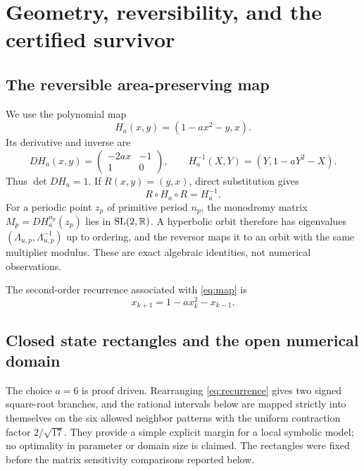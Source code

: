 \section{Geometry, reversibility, and the certified survivor}
\label{sec:geometry}

\subsection{The reversible area-preserving map}

We use the polynomial map
\begin{equation}
 H_a(x,y)=(1-a x^2-y,x).
 \label{eq:map}
\end{equation}
Its derivative and inverse are
\begin{equation}
 DH_a(x,y)=
 \begin{pmatrix}-2ax&-1\\1&0\end{pmatrix},
 \qquad
 H_a^{-1}(X,Y)=(Y,1-aY^2-X).
 \label{eq:derivative-inverse}
\end{equation}
Thus $\det DH_a=1$.  If $R(x,y)=(y,x)$, direct substitution gives
\begin{equation}
 R\circ H_a\circ R=H_a^{-1}.
 \label{eq:reversor}
\end{equation}
For a periodic point $z_p$ of primitive period $n_p$, the monodromy matrix
$M_p=DH_a^{n_p}(z_p)$ lies in $\mathrm{SL}(2,\mathbb{R})$.  A hyperbolic orbit
therefore has eigenvalues $(\Lambda_{u,p},\Lambda_{u,p}^{-1})$ up to ordering,
and the reversor maps it to an orbit with the same multiplier modulus.  These
are exact algebraic identities, not numerical observations.

The second-order recurrence associated with \eqref{eq:map} is
\begin{equation}
 x_{k+1}=1-a x_k^2-x_{k-1}.
 \label{eq:recurrence}
\end{equation}

\subsection{Closed state rectangles and the open numerical domain}

The choice $a=6$ is proof driven.  Rearranging \eqref{eq:recurrence} gives two
signed square-root branches, and the rational intervals below are mapped
strictly into themselves on the six allowed neighbor patterns with the uniform
contraction factor $2/\sqrt{17}$.  They provide a simple explicit margin for a
local symbolic model; no optimality in parameter or domain size is claimed.
The rectangles were fixed before the matrix sensitivity comparisons reported
below.

